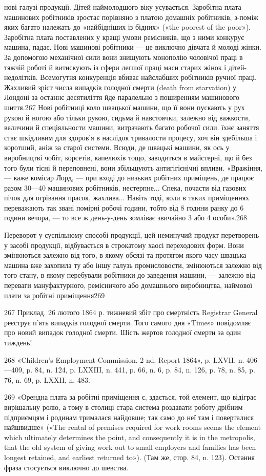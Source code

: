 нові галузі продукції. Дітей наймолодшого віку усувається. Заробітна
плата машинових робітників зростає порівняно з платою
домашніх робітників, з-поміж яких багато належать до
«найбідніших із бідних» («the poorest of the poor»). Заробітна плата
поставлених у кращі умови ремісників, що з ними конкурує
машина, падає. Нові машинові робітники — це виключно дівчата
й молоді жінки. За допомогою механічної сили вони знищують
монополію чоловічої праці в тяжчій роботі й витискують із сфери
легшої праці маси старих жінок і дітей-недолітків. Всемогутня
конкуренція вбиває найслабших робітників ручної праці. Жахливий
зріст числа випадків голодної смерти (death from starvation)
у Лондоні за останнє десятиліття йде паралельно з поширенням
машинового шиття.267 Нові робітниці коло швацької машини,
що її вони пускають у рух рукою й ногою або тільки рукою,
сидьма й навстоячки, залежно від важкости, величини й спеціяльности
машини, витрачають багато робочої сили. їхнє заняття стає
шкідливим для здоров’я в наслідок тривалости процесу, хоч він
здебільша і коротший, аніж за старої системи. Всюди, де швацькі
машини, як ось у виробництві чобіт, корсетів, капелюхів тощо,
заводиться в майстерні, що й без того були тісні й переповнені,
вони збільшують антигігієнічні впливи. «Вражіння, — каже комісар
Лорд, — при вході до низьких робітних приміщень, де працює
разом 30—40 машинових робітників, нестерпне... Спека, почасти
від газових пічок для огрівання прасок, жахлива... Навіть тоді,
коли в таких приміщеннях переважають так звані помірні робочі
години, тобто від 8 години ранку до 6 години вечора, — то все ж
день-у-день зомліває звичайно 3 або 4 особи».268

Переворот у суспільному способі продукції, цей неминучий
продукт перетворень у засобі продукції, відбувається в строкатому
хаосі переходових форм. Вони змінюються залежно від того,
в якому обсязі та протягом якого часу швацька машина вже захопила
ту або іншу галузь промисловости, змінюються залежно
від того стану, в якому перебували робітники до заведення
машини, — залежно від переваги мануфактурного, ремісничого або
домашнього виробництва, наймової плати за робітні приміщення269

267    Приклад. 26 лютого 1864 р. тижневий збіт про смертність Registrar
General реєструє п’ять випадків голодної смерти. Того самого
дня «Times» повідомляє про новий випадок голодної смерти. Шість жертов
голодної смерти за один тиждень!

268 «Children’s Employment Commission. 2 nd. Report 1864», p. LXVII,
n. 406—409, p. 84, n. 124, p. LXXIII, n. 441, p. 66, n. 6, p. 84, n. 126,
p. 78, n. 85, p. 76, n. 69, p. LXXII, n. 483.

269 «Орендна плата за робітні приміщення є, здається, той елемент,
що відіграє вирішальну ролю, а тому в столиці стара система роздавати
роботу дрібним підприємцям і родинам трималася найдовше; так само
до неї там і поверталися найшвидше» («The rental of premises required
for work rooms seems the element which ultimately determines the point,
and consequently it is in the metropolis, that the old system of giving work
out to small employers and families has been longest retained, and earliest
returned to»). (Там же, стор. 84, n. 123). Остання фраза стосується виключно
до шевства.
